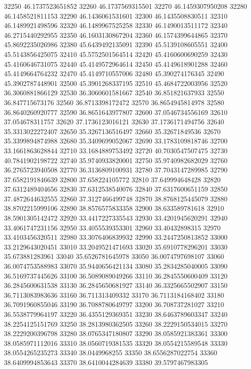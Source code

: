 {32250 46.1737523651852
32260 46.1737569315501
32270 46.1459307950208
32280 46.1458521811153
32290 46.1436061531601
32300 46.1435508830511
32310 46.1489921498596
32320 46.1489967525258
32330 46.1490013511172
32340 46.2715440292955
32350 46.1603130867204
32360 46.1574399644865
32370 45.8692235026986
32380 45.6439492135091
32390 45.5139108605551
32400 45.5143856425075
32410 45.5752501564514
32420 45.4160600690259
32430 45.4160646731075
32440 45.4149572964614
32450 45.4149618901288
32460 45.4149664764232
32470 45.4149710557006
32480 45.390274176345
32490 45.3902787448901
32500 45.3901268337195
32510 45.4684722003956
32520 36.3060881866129
32530 36.3060601581667
32540 36.851821637933
32550 36.847715673176
32560 36.8713398172472
32570 36.8654945814978
32580 36.8640260920777
32590 36.8651643977807
32600 37.0546734556169
32610 37.054678311757
32620 37.1736123016121
32630 37.1736171494756
32640 35.3313022272407
32650 35.3267136516497
32660 35.32671849536
32670 35.3399894874988
32680 35.3409699052067
32690 33.1783109818746
32700 33.1661863628844
32710 33.1684889753492
32720 40.7030547507475
32730 40.7841902198722
32740 35.9740933820001
32750 35.9740982682029
32760 36.2765723940508
32770 36.3136809100931
32780 37.7043147289985
32790 37.6582191846639
32800 37.658224105772
32810 37.649994648428
32820 37.6312489404656
32830 37.6312538540076
32840 37.6317600651159
32850 37.4872644632555
32860 37.3127466499748
32870 38.8768125445079
32880 38.8702215999106
32890 38.8576575833358
32900 38.633589781618
32910 38.5901305142472
32920 33.4417227335543
32930 33.4201945620291
32940 33.4061747231156
32950 33.4055539353301
32960 33.40432898315
32970 33.4103456320511
32980 33.3076406839932
32990 33.2447250813852
33000 33.2129643020451
33010 33.2049521471693
33020 35.6910778296201
33030 35.673881283961
33040 35.6526781645978
33050 36.0074797698107
33060 36.0074753588983
33070 35.9440656421134
33080 35.2834285040005
33090 36.5169737445626
33100 36.5089089049266
33110 36.2845550600409
33120 36.2845600631538
33130 36.2845650681927
33140 36.3325665502907
33150 36.7113083983636
33160 36.711313409332
33170 36.7113184168402
33180 36.7091960855046
33190 36.7088780649797
33200 36.708737281027
33210 36.5538779964197
33220 36.4355129369351
33230 38.6463789603347
33240 38.2254125151769
33250 38.2813980362505
33260 38.2229150534015
33270 38.2229200396798
33280 38.0765347180807
33290 38.0585921383361
33300 38.0585971112016
33310 38.0560719381535
33320 38.0554215589548
33330 38.0554265235273
33340 38.0449968255
33350 38.6556287022754
33360 38.6409994853643
33370 38.6410044284639
33380 39.5797467983305
}
